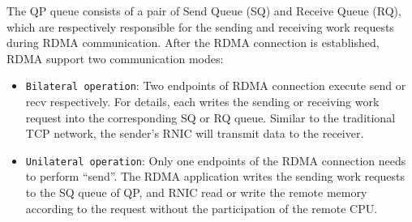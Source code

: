 The QP queue consists of a pair of Send Queue (SQ) and Receive Queue (RQ), which are respectively responsible for the sending and receiving work requests during RDMA communication. After the RDMA connection is established, RDMA support two communication modes:

\begin{itemize}
\item {\verb|Bilateral operation|}: Two endpoints of RDMA connection execute send or recv respectively. For details, each writes the sending or receiving work request into the corresponding SQ or RQ queue. Similar to the traditional TCP network, the sender's RNIC will transmit data to the receiver.

\item {\verb|Unilateral operation|}: Only one endpoints of the RDMA connection needs to perform ``send''. The RDMA application writes the sending work requests to the SQ queue of QP, and RNIC read or write the remote memory according to the request without the participation of the remote CPU.

\end{itemize}
